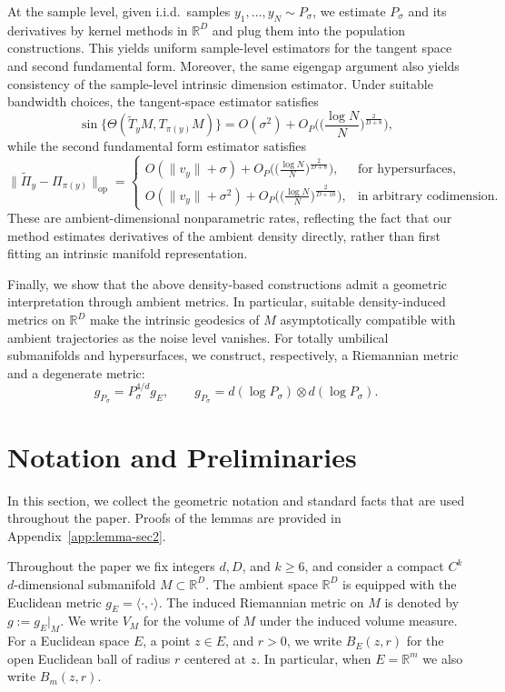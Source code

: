 \documentclass[11pt]{article}
\theoremstyle{plain}
\theoremstyle{definition}
\begin{document}
At the sample level, given i.i.d.\ samples $y_1,\dots,y_N\sim P_\sigma$, we estimate $P_\sigma$ and its derivatives by kernel methods in $\mathbb{R}^D$ and plug them into the population constructions. This yields uniform sample-level estimators for the tangent space and second fundamental form. Moreover, the same eigengap argument also yields consistency of the sample-level intrinsic dimension estimator. Under suitable bandwidth choices, the tangent-space estimator satisfies
\[
\sin\{\Theta(\widetilde T_yM,T_{\pi(y)}M)\}
=
O(\sigma^2)
+
O_P\big(\big(\frac{\log N}{N}\big)^{\frac{2}{D+8}}\big),
\]
while the second fundamental form estimator satisfies
\[
\|\widetilde\Pi_y-\Pi_{\pi(y)}\|_{\mathrm{op}}
=
\begin{cases}
O(\|v_y\|+\sigma)
+
O_P\big(\big(\frac{\log N}{N}\big)^{\frac{2}{D+8}}\big),
& \text{for hypersurfaces},\\[0.75em]
O(\|v_y\|+\sigma^2)
+
O_P\big(\big(\frac{\log N}{N}\big)^{\frac{2}{D+10}}\big),
& \text{in arbitrary codimension}.
\end{cases}
\]
These are ambient-dimensional nonparametric rates, reflecting the fact that our method estimates derivatives of the ambient density directly, rather than first fitting an intrinsic manifold representation.

Finally, we show that the above density-based constructions admit a geometric interpretation through ambient metrics. In particular, suitable density-induced metrics on $\mathbb{R}^D$ make the intrinsic geodesics of $M$ asymptotically compatible with ambient trajectories as the noise level vanishes. For totally umbilical submanifolds and hypersurfaces, we construct, respectively, a Riemannian metric and a degenerate metric:
\[
g_{P_\sigma} = P_\sigma^{4/d} g_E, \qquad g_{P_\sigma} = d(\log P_\sigma)\otimes d(\log P_\sigma).
\]

\section{Notation and Preliminaries}\label{sec:prelim}
In this section, we collect the geometric notation and standard facts that are used throughout the paper. Proofs of the lemmas are provided in Appendix~\ref{app:lemma-sec2}.

Throughout the paper we fix integers $d, D$, and $k\ge6$, and consider a compact $C^k$ $d$-dimensional submanifold $M\subset \mathbb{R}^D$. The ambient space $\mathbb{R}^D$ is equipped with the Euclidean metric $g_E = \langle\cdot, \cdot \rangle$. The induced Riemannian metric on $M$ is denoted by $g:=g_E|_M$. We write $V_M$ for the volume of $M$ under the induced volume measure. 
For a Euclidean space $E$, a point $z\in E$, and $r>0$, we write $B_E(z,r)$ for the open Euclidean ball of radius $r$ centered at $z$. In particular, when $E=\mathbb R^m$ we also write $B_m(z,r)$.
\end{document}
